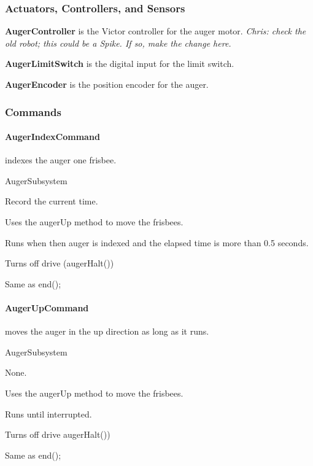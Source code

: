 \documentclass[]{article}
\begin{document}
\subsubsection{Actuators, Controllers, and Sensors}

\textbf{AugerController} is the Victor controller for the auger motor. \textit{Chris: check the old robot; this could be a Spike. If so, make the change here.}

\textbf{AugerLimitSwitch} is the digital input for the limit switch.

\textbf{AugerEncoder} is the position encoder for the auger.

\subsubsection{Commands}

\paragraph{AugerIndexCommand} indexes the auger one frisbee.
\begin{description}[topsep=0ex]
\item[requires] AugerSubsystem
\item[initialization] Record the current time.
\item[execute] Uses the augerUp method to move the frisbees.
\item[isDone] Runs when then auger is indexed and the elapsed time is more than 0.5 seconds.
\item[end] Turns off drive (augerHalt())
\item[interrupted] Same as end();
\end{description}

\paragraph{AugerUpCommand} moves the auger in the up direction as long as it runs.
\begin{description}[topsep=0ex]
\item[requires] AugerSubsystem
\item[initialization]  None.
\item[execute] Uses the augerUp method to move the frisbees.
\item[isDone] Runs until interrupted.
\item[end] Turns off drive augerHalt())
\item[interrupted] Same as end();
\end{description}
\end{document}
